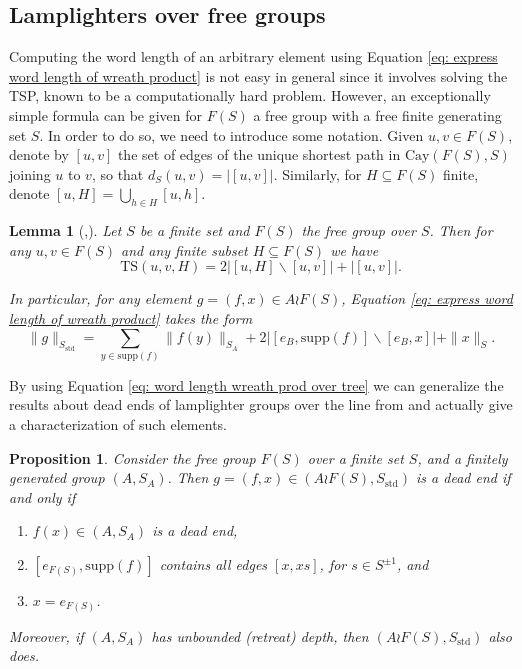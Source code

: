 \documentclass[reqno,oneside]{amsart}
\newcommand{\cay}[2]{\mathrm{Cay}(#1,#2)}
\newcommand{\supp}[1]{\mathrm{supp}(#1)}
\newcommand{\std}{S_{\mathrm{std}}}
\newcommand{\TS}[3]{\mathrm{TS}\left(#1,#2,#3\right)}
\theoremstyle{plain}
\newtheorem{prop}[thm]{Proposition}
\newtheorem{lem}[thm]{Lemma}
\theoremstyle{definition}
\begin{document}
\subsection{Lamplighters over free groups}
Computing the word length of an arbitrary element using Equation \eqref{eq: express word length of wreath product} is not easy in general since it involves solving the TSP, known to be a computationally hard problem. However, an exceptionally simple formula can be given for $F(S)$ a free group with a free finite generating set $S$. In order to do so, we need to introduce some notation. Given $u,v\in F(S)$, denote by $[u,v]$ the set of edges of the unique shortest path in $\cay{F(S)}{S}$ joining $u$ to $v$, so that $d_{S}(u,v)=|[u,v]|$. Similarly, for $H\subseteq F(S)$ finite, denote $[u,H]=\bigcup_{h\in H}[u,h]$.
\begin{lem}[{\cite[Theorem 3.1]{BaudierMotakisSchumprechtZsak2021}},\cite{ClearyTaback05}]\label{lem: word length lamplighter over tree} Let $S$ be a finite set and $F(S)$ the free group over $S$. Then for any $u,v\in F(S)$ and any finite subset $H\subseteq F(S)$ we have
	$$
	\TS{u}{v}{H}=2| [u,H]\backslash [u,v] |+|[u,v]|.
	$$
	
	In particular, for any element $g=(f,x)\in A\wr F(S)$, Equation \eqref{eq: express word length of wreath product} takes the form
	\begin{equation}\label{eq: word length wreath prod over tree}
	\|g\|_{\std}=\sum_{y\in\supp{f}}\|f(y)\|_{S_A}+2| [e_B,\supp{f}]\backslash [e_B,x] |+ \|x\|_S.
	\end{equation}
\end{lem}

By using Equation \eqref{eq: word length wreath prod over tree} we can generalize the results about dead ends of lamplighter groups over the line from \cite{ClearyTaback05} and actually give a characterization of such elements.


\begin{prop}\label{prop: characterization of dead ends on lamplighters over free groups} Consider the free group $F(S)$ over a finite set $S$, and a finitely generated group $(A,S_A)$. Then $g=(f,x)\in (A\wr F(S),\std)$ is a dead end if and only if
	\begin{enumerate}
		\item $f(x)\in (A,S_A)$ is a dead end,
		\item $[e_{F(S)},\supp{f}]$ contains all edges $[x,xs]$, for $s\in S^{\pm 1}$, and
		\item $x=e_{F(S)}$.
	\end{enumerate}
	Moreover, if $(A,S_A)$ has unbounded (retreat) depth, then $(A\wr F(S),\std)$ also does.
\end{prop}
\end{document}
